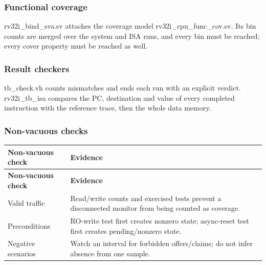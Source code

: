 \documentclass[11pt]{article}
\begin{document}
\subsubsection{Functional coverage}
\noindent rv32i\_bind\_sva.sv attaches the coverage model rv32i\_cpu\_func\_cov.sv. Its bin counts are merged over the system and ISA runs, and every bin must be reached; every cover property must be reached as well.\par\medskip
\subsubsection{Result checkers}
\noindent tb\_check.vh counts mismatches and ends each run with an explicit verdict. rv32i\_tb\_isa compares the PC, destination and value of every completed instruction with the reference trace, then the whole data memory.\par\medskip
\subsubsection{Non-vacuous checks}
{\small
\begin{longtable}{@{}L{0.3200\dimexpr\linewidth-12pt\relax}L{0.6800\dimexpr\linewidth-12pt\relax}@{}}
\toprule
\textbf{Non-vacuous check} & \textbf{Evidence} \\ \midrule
\endfirsthead
\toprule
\textbf{Non-vacuous check} & \textbf{Evidence} \\ \midrule
\endhead
Valid traffic & Read/write counts and exercised tests prevent a disconnected monitor from being counted as coverage. \\ \addlinespace[3pt]
Preconditions & RO-write test first creates nonzero state; async-reset test first creates pending/nonzero state. \\ \addlinespace[3pt]
Negative scenarios & Watch an interval for forbidden offers/claims; do not infer absence from one sample. \\*
\bottomrule\end{longtable}}

\end{document}
